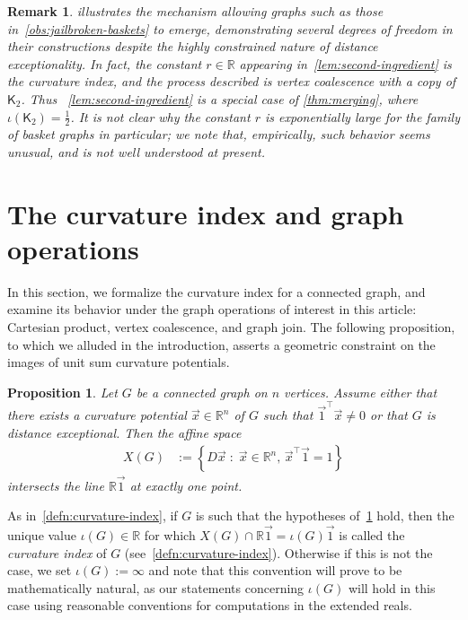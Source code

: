 \documentclass[11pt,a4paper]{article}
\newcommand{\distmatrix}{D}
\newcommand{\x}{\vec{x}}
\newcommand{\one}{\vec{1}}
\newcommand{\Complete}{\mathsf{K}}
\newtheorem{remark}[theorem]{Remark}
\newtheorem{proposition}[theorem]{Proposition}
\begin{document}
    \begin{remark}\label{rmk:basket}
         illustrates the mechanism allowing graphs such as those in~\cref{obs:jailbroken-baskets} to emerge, demonstrating several degrees of freedom in their constructions despite the highly constrained nature of distance exceptionality. In fact, the constant $r\in\mathbb{R}$ appearing in~\cref{lem:second-ingredient} is the curvature index, and the process described is vertex coalescence with a copy of $\Complete_2$. Thus ~\cref{lem:second-ingredient} is a special case of \cref{thm:merging}, where $\iota(\Complete_2) = \frac{1}{2}$. It is not clear why the constant $r$ is exponentially large for the family of basket graphs in particular; we note that, empirically, such behavior seems unusual, and is not well understood at present.
    \end{remark}

    \section{The curvature index and graph operations}\label{sec:curvature-index}

    In this section, we formalize the curvature index for a connected graph, and examine its behavior under the graph operations of interest in this article: Cartesian product, vertex coalescence, and graph join. The following proposition, to which we alluded in the introduction, asserts a geometric constraint on the images of unit sum curvature potentials.
    
    \begin{proposition}\label{prop:index-of-curvature}
        Let $G$ be a connected graph on $n$ vertices. Assume either that there exists a curvature potential $\x\in\mathbb{R}^{n}$ of $G$ such that $\one^\top\x \ne 0$ or that $G$ is distance exceptional. Then the affine space
            \begin{align*}
                X(G) &:= \left\{\distmatrix\x \;:\; \x\in\mathbb{R}^{n},\, \x^\top\one = 1\right\}
            \end{align*}
        intersects the line $\mathbb{R}\one$ at exactly one point.
    \end{proposition}

    As in~\cref{defn:curvature-index}, if $G$ is such that the hypotheses of~\cref{prop:index-of-curvature} hold, then the unique value $\iota(G)\in\mathbb{R}$ for which $X(G) \cap \mathbb{R}\one = \iota(G)\one$ is called the \emph{curvature index} of $G$ (see~\cref{defn:curvature-index}). Otherwise if this is not the case, we set $\iota(G) := \infty$ and note that this convention will prove to be mathematically natural, as our statements concerning $\iota(G)$ will hold in this case using reasonable conventions for computations in the extended reals.
\end{document}

